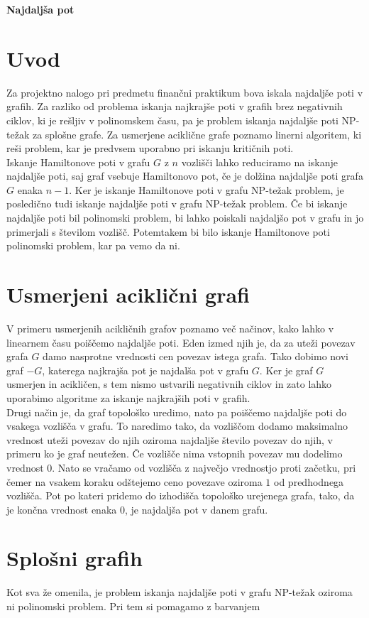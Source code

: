 \documentclass[a4paper, 12pt]{article}
\newcommand{\naslovdela}{Najdaljša pot}
\begin{document}
\begin{center}
    {\bf \naslovdela}\\[3mm]
\end{center}

\section{Uvod}
Za projektno nalogo pri predmetu finančni praktikum bova iskala najdaljše poti v grafih. Za razliko od problema iskanja najkrajše poti v grafih brez negativnih ciklov, ki je rešljiv v polinomskem času, pa je problem iskanja najdaljše poti NP-težak za splošne grafe. Za usmerjene aciklične grafe poznamo linerni algoritem, ki reši problem, kar je predvsem uporabno pri iskanju kritičnih poti. \\
Iskanje Hamiltonove poti v grafu $G$ z $n$ vozlišči lahko reduciramo na iskanje najdaljše poti, saj graf vsebuje Hamiltonovo pot, če je dolžina najdaljše poti grafa $G$ enaka $n-1$. Ker je iskanje Hamiltonove poti v grafu NP-težak problem, je posledično tudi iskanje najdaljše poti v grafu NP-težak problem. Če bi iskanje najdaljše poti bil polinomski problem, bi lahko poiskali najdaljšo pot v grafu in jo primerjali s številom vozlišč. Potemtakem bi bilo iskanje Hamiltonove poti polinomski problem, kar pa vemo da ni.

\section{Usmerjeni aciklični grafi}
V primeru usmerjenih acikličnih grafov poznamo več načinov, kako lahko v linearnem času poiščemo najdaljše poti. Eden izmed njih je, da za uteži povezav grafa $G$ damo nasprotne vrednosti cen povezav istega grafa. Tako dobimo novi graf $-G$, katerega najkrajša pot je najdalša pot v grafu $G$. Ker je graf $G$ usmerjen in acikličen, s tem nismo ustvarili negativnih ciklov in zato lahko uporabimo algoritme za iskanje najkrajših poti v grafih. \\
Drugi način je, da graf topološko uredimo, nato pa poiščemo najdaljše poti do vsakega vozlišča v grafu. To naredimo tako, da vozliščom dodamo maksimalno vrednost uteži povezav do njih oziroma najdaljše število povezav do njih, v primeru ko je graf neutežen. Če vozlišče nima vstopnih povezav mu dodelimo vrednost $0$. Nato se vračamo od vozlišča z največjo vrednostjo proti začetku, pri čemer na vsakem koraku odštejemo ceno povezave oziroma $1$ od predhodnega vozlišča. Pot po kateri pridemo do izhodišča topološko urejenega grafa, tako, da je končna vrednost enaka $0$, je najdaljša pot v danem grafu.

\section{Splošni grafih}
Kot sva že omenila, je problem iskanja najdaljše poti v grafu NP-težak oziroma ni polinomski problem. Pri tem si pomagamo z barvanjem
\end{document}
